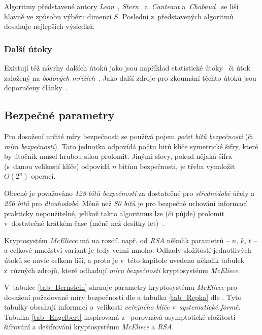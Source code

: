 \documentclass[thesis=M,czech,hidelinks]{FITthesis}[2012/06/26]
\newcommand{\0}{{\textcolor[gray]{0.80}{0}}}
\begin{document}
Algoritmy představené autory \emph{Leon}~\cite{Leon}, \emph{Stern}~\cite{Stern}
a~\emph{Canteaut} a~\emph{Chabaud}~\cite{Canteaut} se liší hlavně ve způsobu
výběru dimenzí $S$. Poslední z~představených algoritmů dosahuje nejlepších
výsledků.


\subsubsection{Další útoky}

Existují též návrhy dalších útoků jako jsou například statistické
útoky~\cite{Jabri} či útok založený na \emph{bodových mřížích}~\cite{Brickell}.
Jako další zdroje pro zkoumání těchto útoků jsou doporučeny
články~\cite{Repka,Engelbert}.



\subsection{Bezpečné parametry}\label{kap_bezpecne_parametry}

Pro dosažení určité míry bezpečnosti se používá pojem \emph{počet bitů
bezpečnosti} (či \emph{míra bezpečnosti}). Tato jednotka odpovídá počtu bitů
klíče symetrické šifry, které by útočník musel hrubou silou prolomit. Jinými
slovy, pokud nějaká šifra (s~danou velikostí klíče) odpovídá $n$ bitům
bezpečnosti, je třeba vynaložit $O\left(2^n\right)$ operací.

Obecně je považováno \emph{128 bitů bezpečnosti} za dostatečné pro
\emph{střednědobé} účely a \emph{256 bitů} pro \emph{dlouhodobé}. Méně než
\emph{80 bitů} je pro bezpečné uchování informací prakticky nepoužitelné,
jelikož takto  algoritmus lze (či půjde) prolomit v~dostatečně krátkém
čase (méně než desítky let)~\cite{Paar}.

Kryptosystém \emph{McEliece} má na rozdíl např. od \emph{RSA} několik parametrů
-- $n$, $k$, $t$ -- a celkové množství variant je tedy velmi mnoho.  Odhady
složitostí jednotlivých útoků se navíc celkem liší, a proto je v~této kapitole
uvedeno několik tabulek z~různých zdrojů, které odhadují \emph{míru bezpečnosti}
kryptosystému \emph{McEliece}.

V~tabulce \ref{tab_Bernstein} shrnuje parametry kryptosystému \emph{McEliece}
pro dosažení požadované míry bezpečnosti dle \cite{Bernstein1} a tabulka
\ref{tab_Repka} dle \cite{Repka}. Tyto tabulky obsahují informaci o~velikosti
\emph{veřejného klíče} v~\emph{systematické formě}. Tabulka \ref{tab_Engelbert}
inspirovaná z~\cite{Engelbert,Paar} porovnává asymptotické složitosti šifrování
a dešifrování kryptosystému \emph{McEliece} a \emph{RSA}.
\end{document}
